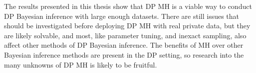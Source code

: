\documentclass[english,twoside,openright]{HYgraduMLDS}
\begin{document}
The results presented in this thesis show that DP MH is a viable way to
conduct DP Bayesian inference with large enough datasets. There are still
issues that should be investigated before deploying DP MH with real
private data, but they are likely solvable, and most, like parameter tuning,
and inexact sampling, also affect other methods of DP Bayesian inference.
The benefits of MH over other Bayesian inference methods are present in the
DP setting, so research into the many unknowns of DP MH is likely to be
fruitful.


\cleardoublepage %


\end{document}
